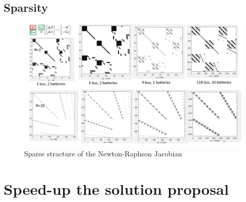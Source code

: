 \documentclass{beamer}
\begin{document}
\subsection{Sparsity}
\begin{frame}
\begin{figure}[!htbp]
\centering
\includegraphics[width=4.1 in , height=2.8 in]{Figures/Sparsity.png}
\caption{Sparse stracture of the Newton-Raphson Jacobian}
\label{sparsity}
\end{figure}
\end{frame}

%

\section{Speed-up the solution proposal}
\end{document}
